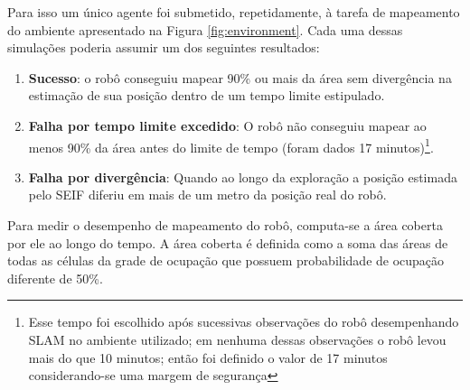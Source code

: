 Para isso um único agente foi submetido, repetidamente, à tarefa de mapeamento do ambiente apresentado na Figura \ref{fig:environment}. 
Cada uma dessas simulações poderia assumir um dos seguintes resultados:
\begin{enumerate}
  \item \textbf{Sucesso}: o robô conseguiu mapear 90\% ou mais da área sem 
  divergência na estimação de sua posição dentro de um tempo limite estipulado.
  \item \textbf{Falha por tempo limite excedido}: O robô não conseguiu mapear ao 
  menos 90\% da área antes do limite de tempo (foram dados 17 
  minutos)\footnote{Esse tempo foi escolhido após sucessivas observações do robô desempenhando SLAM no ambiente utilizado; em nenhuma dessas observações o robô levou mais do que 10 minutos; então foi definido o valor de 17 minutos considerando-se uma margem de segurança}.
  \item \textbf{Falha por divergência}: Quando ao longo da exploração a posição estimada pelo SEIF diferiu em mais de um metro da posição real do robô.
\end{enumerate}

Para medir o desempenho de mapeamento do robô, 
computa-se a área coberta 
por ele ao longo do tempo. A área coberta é definida como a soma das 
áreas de todas as células da grade de ocupação que possuem probabilidade 
de ocupação diferente de 50\%.


